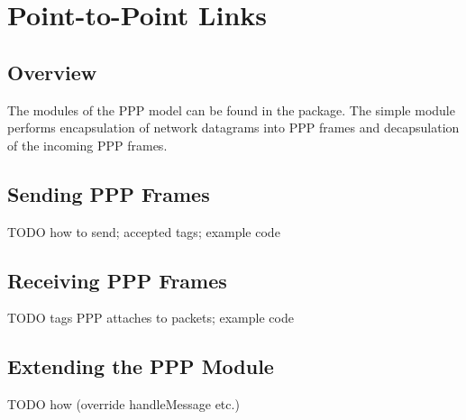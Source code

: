 \chapter{Point-to-Point Links}
\label{cha:ppp}


\section{Overview}

The modules of the PPP model can be found in the 
package. The  simple module performs encapsulation
of network datagrams into PPP frames and decapsulation of
the incoming PPP frames.

\section{Sending PPP Frames}

TODO how to send; accepted tags; example code

\section{Receiving PPP Frames}

TODO tags PPP attaches to packets; example code

\section{Extending the PPP Module}

TODO how (override handleMessage etc.)



